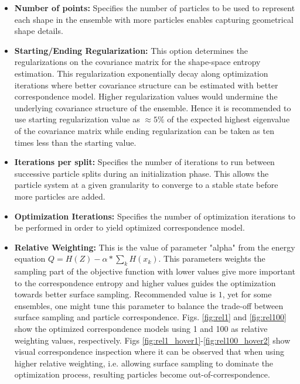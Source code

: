 \documentclass[letterpaper,12pt]{article}   %
\begin{document}
\begin{itemize}
\item \textbf{Number of points:} Specifies the number of particles to be used to represent each shape in the ensemble with more particles enables capturing geometrical shape details. %

\item \textbf{Starting/Ending Regularization:} This option determines the regularizations on the covariance matrix for the shape-space entropy estimation. This regularization exponentially decay along optimization iterations where better covariance structure can be estimated with better correspondence model. Higher regularization values would undermine the underlying covariance structure of the ensemble. Hence it is recommended to use starting regularization value as $\approx 5\%$ of the expected highest eigenvalue of the covariance matrix while ending regularization can be taken as ten times less than the starting value. 

\item \textbf{Iterations per split:} Specifies the number of iterations to run between successive particle splits during an initialization phase. This allows the particle system at a given granularity to converge to a stable state before more particles are added.

\item \textbf{Optimization Iterations:} Specifies the number of optimization iterations to be performed in order to yield optimized correspondence model. %

\item \textbf{Relative Weighting:} This is the value of parameter "alpha" from the energy equation $Q = H(Z) - \alpha * \sum_k H(x_k)$. This parameters weights the sampling part of the objective function with lower values give more important to the correspondence entropy and higher values guides the optimization towards better surface sampling. Recommended value is $1$, yet for some ensembles, one might tune this parameter to balance the trade-off between surface sampling and particle correspondence. Figs. \ref{fig:rel1} and \ref{fig:rel100} show the optimized correspondence models using 1 and 100 as relative weighting values, respectively. Figs \ref{fig:rel1_hover1}-\ref{fig:rel100_hover2} show visual correspondence inspection where it can be observed that when using higher relative weighting, i.e. allowing surface sampling to dominate the optimization process, resulting particles become out-of-correspondence.


\end{itemize}
\end{document}
